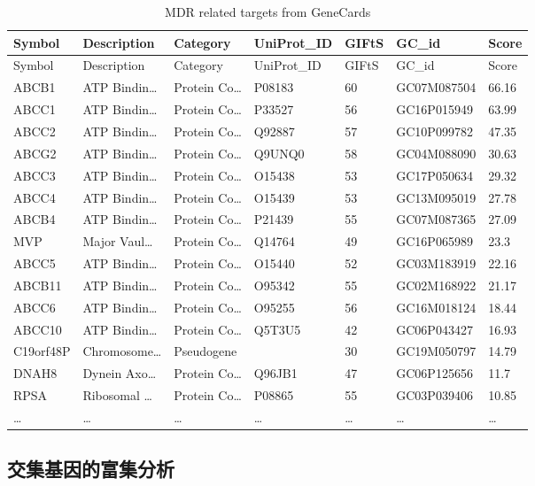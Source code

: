 \documentclass[
]{article}
\begin{document}
\begin{longtable}[]{@{}lllllll@{}}
\caption{\label{tab:MDR-related-targets-from-GeneCards}MDR related targets from GeneCards}\tabularnewline
\toprule
Symbol & Description & Category & UniProt\_ID & GIFtS & GC\_id & Score\tabularnewline
\midrule
\endfirsthead
\toprule
Symbol & Description & Category & UniProt\_ID & GIFtS & GC\_id & Score\tabularnewline
\midrule
\endhead
ABCB1 & ATP Bindin\ldots{} & Protein Co\ldots{} & P08183 & 60 & GC07M087504 & 66.16\tabularnewline
ABCC1 & ATP Bindin\ldots{} & Protein Co\ldots{} & P33527 & 56 & GC16P015949 & 63.99\tabularnewline
ABCC2 & ATP Bindin\ldots{} & Protein Co\ldots{} & Q92887 & 57 & GC10P099782 & 47.35\tabularnewline
ABCG2 & ATP Bindin\ldots{} & Protein Co\ldots{} & Q9UNQ0 & 58 & GC04M088090 & 30.63\tabularnewline
ABCC3 & ATP Bindin\ldots{} & Protein Co\ldots{} & O15438 & 53 & GC17P050634 & 29.32\tabularnewline
ABCC4 & ATP Bindin\ldots{} & Protein Co\ldots{} & O15439 & 53 & GC13M095019 & 27.78\tabularnewline
ABCB4 & ATP Bindin\ldots{} & Protein Co\ldots{} & P21439 & 55 & GC07M087365 & 27.09\tabularnewline
MVP & Major Vaul\ldots{} & Protein Co\ldots{} & Q14764 & 49 & GC16P065989 & 23.3\tabularnewline
ABCC5 & ATP Bindin\ldots{} & Protein Co\ldots{} & O15440 & 52 & GC03M183919 & 22.16\tabularnewline
ABCB11 & ATP Bindin\ldots{} & Protein Co\ldots{} & O95342 & 55 & GC02M168922 & 21.17\tabularnewline
ABCC6 & ATP Bindin\ldots{} & Protein Co\ldots{} & O95255 & 56 & GC16M018124 & 18.44\tabularnewline
ABCC10 & ATP Bindin\ldots{} & Protein Co\ldots{} & Q5T3U5 & 42 & GC06P043427 & 16.93\tabularnewline
C19orf48P & Chromosome\ldots{} & Pseudogene & & 30 & GC19M050797 & 14.79\tabularnewline
DNAH8 & Dynein Axo\ldots{} & Protein Co\ldots{} & Q96JB1 & 47 & GC06P125656 & 11.7\tabularnewline
RPSA & Ribosomal \ldots{} & Protein Co\ldots{} & P08865 & 55 & GC03P039406 & 10.85\tabularnewline
\ldots{} & \ldots{} & \ldots{} & \ldots{} & \ldots{} & \ldots{} & \ldots{}\tabularnewline
\bottomrule
\end{longtable}

\begin{center}\vspace{1.5cm}\end{center}

\hypertarget{ux4ea4ux96c6ux57faux56e0ux7684ux5bccux96c6ux5206ux6790}{%
\subsection{交集基因的富集分析}\label{ux4ea4ux96c6ux57faux56e0ux7684ux5bccux96c6ux5206ux6790}}
\end{document}
